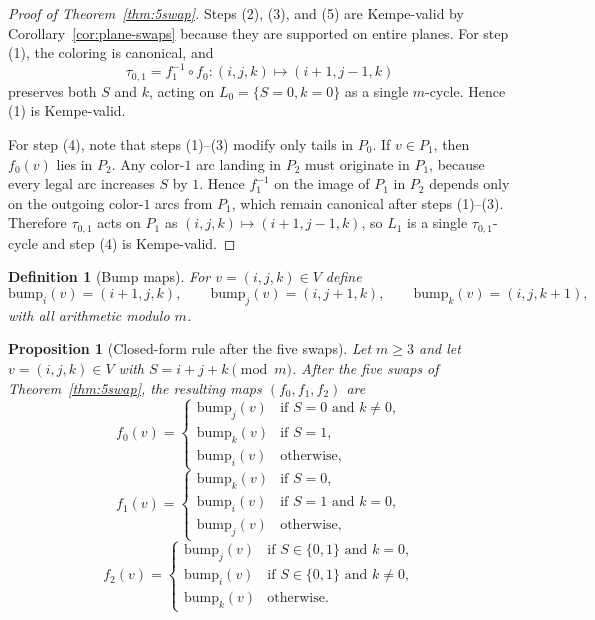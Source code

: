 \documentclass[11pt]{article}
\newtheorem{proposition}{Proposition}
\newtheorem{definition}{Definition}
\begin{document}
\begin{proof}[Proof of Theorem~\ref{thm:5swap}]
Steps (2), (3), and (5) are Kempe-valid by Corollary~\ref{cor:plane-swaps} because they are supported on entire planes.
For step (1), the coloring is canonical, and
\[
\tau_{0,1}=f_1^{-1}\circ f_0:(i,j,k)\mapsto(i+1,j-1,k)
\]
preserves both $S$ and $k$, acting on $L_0=\{S=0,k=0\}$ as a single $m$-cycle.
Hence (1) is Kempe-valid.

For step (4), note that steps (1)--(3) modify only tails in $P_0$.
If $v\in P_1$, then $f_0(v)$ lies in $P_2$.
Any color-$1$ arc landing in $P_2$ must originate in $P_1$, because every legal arc increases $S$ by $1$.
Hence $f_1^{-1}$ on the image of $P_1$ in $P_2$ depends only on the outgoing color-$1$ arcs from $P_1$, which remain canonical after steps (1)--(3).
Therefore $\tau_{0,1}$ acts on $P_1$ as $(i,j,k)\mapsto(i+1,j-1,k)$, so $L_1$ is a single $\tau_{0,1}$-cycle and step (4) is Kempe-valid.
\end{proof}

\begin{definition}[Bump maps]
For $v=(i,j,k)\in V$ define
\[
\mathrm{bump}_i(v)=(i+1,j,k),\qquad
\mathrm{bump}_j(v)=(i,j+1,k),\qquad
\mathrm{bump}_k(v)=(i,j,k+1),
\]
with all arithmetic modulo $m$.
\end{definition}

\begin{proposition}[Closed-form rule after the five swaps]\label{prop:odd-closed}
Let $m\ge 3$ and let $v=(i,j,k)\in V$ with $S=i+j+k\pmod m$.
After the five swaps of Theorem~\ref{thm:5swap}, the resulting maps $(f_0,f_1,f_2)$ are
\[
f_0(v)=
\begin{cases}
\mathrm{bump}_j(v) & \text{if } S=0 \text{ and } k\neq 0,\\
\mathrm{bump}_k(v) & \text{if } S=1,\\
\mathrm{bump}_i(v) & \text{otherwise,}
\end{cases}
\]
\[
f_1(v)=
\begin{cases}
\mathrm{bump}_k(v) & \text{if } S=0,\\
\mathrm{bump}_i(v) & \text{if } S=1 \text{ and } k=0,\\
\mathrm{bump}_j(v) & \text{otherwise,}
\end{cases}
\]
\[
f_2(v)=
\begin{cases}
\mathrm{bump}_j(v) & \text{if } S\in\{0,1\} \text{ and } k=0,\\
\mathrm{bump}_i(v) & \text{if } S\in\{0,1\} \text{ and } k\neq 0,\\
\mathrm{bump}_k(v) & \text{otherwise.}
\end{cases}
\]
\end{proposition}
\end{document}
